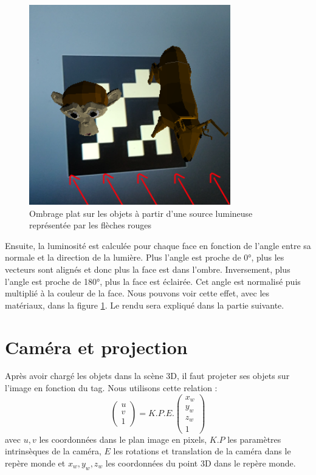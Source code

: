         \begin{figure}[!h]
            \centering
            \includegraphics[scale=0.5]{img/rendu/flat_shading.png}
            \caption{Ombrage plat sur les objets à partir d'une source lumineuse représentée par les flèches rouges}
            \label{fig:lumiere}
        \end{figure}

        Ensuite, la luminosité est calculée pour chaque face en fonction de l'angle entre sa normale et la direction de la lumière. Plus l'angle est proche de 0°, plus les vecteurs sont alignés et donc plus la face est dans l'ombre. Inversement, plus l'angle est proche de 180°, plus la face est éclairée. Cet angle est normalisé puis multiplié à la couleur de la face. Nous pouvons voir cette effet, avec les matériaux, dans la figure \ref{fig:lumiere}. Le rendu sera expliqué dans la partie suivante.

    \section{Caméra et projection}
        Après avoir chargé les objets dans la scène 3D, il faut projeter ses objets sur l'image en fonction du tag. Nous utilisons cette relation :
        \begin{equation*}
            \begin{pmatrix}
                u \\ v \\ 1
            \end{pmatrix}
            = K.P.E.
            \begin{pmatrix}
                x_w \\ y_w \\ z_w \\ 1
            \end{pmatrix}
        \end{equation*}
        avec $u,v$ les coordonnées dans le plan image en pixels, $K.P$ les paramètres intrinsèques de la caméra, $E$ les rotations et translation de la caméra dans le repère monde et $x_w, y_w, z_w$ les coordonnées du point 3D dans le repère monde.

